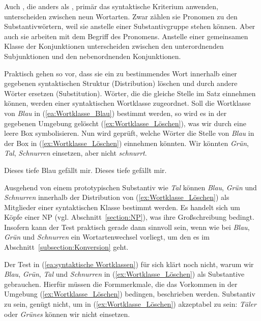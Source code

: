 Auch \citet[19]{HelbigBuscha}, die anders als \citet{Glinz1962}, primär das syntaktische Kriterium anwenden, unterscheiden zwischen neun Wortarten. Zwar zählen sie Pronomen zu den Substantivwörtern, weil sie anstelle einer Substantivgruppe stehen können. Aber auch sie arbeiten mit dem Begriff des Pronomens. Anstelle einer gemeinsamen Klasse der Konjunktionen unterscheiden \citet[20]{HelbigBuscha} zwischen den unterordnenden Subjunktionen und den nebenordnenden Konjunktionen. 

Praktisch gehen \citet[19--20]{HelbigBuscha} so vor, dass sie ein zu bestimmendes Wort innerhalb einer gegebenen syntaktischen Struktur (Distribution) löschen und durch andere Wörter ersetzen (Substitution). Wörter, die die gleiche Stelle im Satz einnehmen können, werden einer syntaktischen Wortklasse zugeordnet. Soll \zB die Wortklasse von \textit{Blau} in (\ref{ea:Wortklasse_Blau}) bestimmt werden, so wird es in der gegebenen Umgebung gelöscht (\ref{ex:Wortklasse_Löschen}), was wir durch eine leere Box symbolisieren. Nun wird geprüft, welche Wörter die Stelle von \textit{Blau} in der Box in (\ref{ex:Wortklasse_Löschen}) einnehmen könnten. Wir könnten \zB \textit{Grün}, \textit{Tal}, \textit{Schnurren} einsetzen, aber nicht \textit{schnurrt}.  

\ea \label{ea:syntaktische Wortklassen}
\ea \label{ea:Wortklasse_Blau} Dieses tiefe Blau gefällt mir.
\ex \label{ex:Wortklasse_Löschen} Dieses tiefe \fbox{\phantom{Blau}} gefällt mir.
\z 
\z 

Ausgehend von einem prototypischen Substantiv wie \textit{Tal} können \textit{Blau}, \textit{Grün} und \textit{Schnurren} innerhalb der Distribution von (\ref{ex:Wortklasse_Löschen}) als Mitglieder einer syntaktischen Klasse bestimmt werden. Es handelt sich um Köpfe einer NP (vgl. Abschnitt~\ref{section:NP}), was ihre Großschreibung bedingt. Insofern kann der Test praktisch gerade dann sinnvoll sein, wenn wie bei \textit{Blau}, \textit{Grün} und \textit{Schnurren} ein Wortartenwechsel vorliegt, um den es im Abschnitt~\ref{subsection:Konversion} geht. 

Der Test in (\ref{ea:syntaktische Wortklassen}) für sich klärt noch nicht, warum wir \textit{Blau}, \textit{Grün}, \textit{Tal} und \textit{Schnurren} in (\ref{ex:Wortklasse_Löschen}) als Substantive gebrauchen. Hierfür müssen die Formmerkmale, die das Vorkommen in der Umgebung (\ref{ex:Wortklasse_Löschen}) bedingen, beschrieben werden. Substantiv zu sein, genügt nicht, um in (\ref{ex:Wortklasse_Löschen}) akzeptabel zu sein: \textit{Täler} oder \textit{Grünes} können wir nicht einsetzen. 

